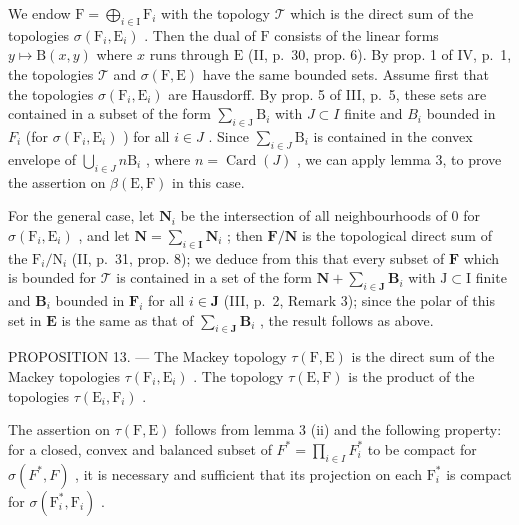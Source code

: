 We endow \(\mathrm{F} = \bigoplus_{i\in \mathrm{I}}\mathrm{F}_i\) with the topology \(\mathcal{T}\) which is the direct sum of the topologies \(\sigma (\mathrm{F}_i,\mathrm{E}_i)\) . Then the dual of \(\mathrm{F}\) consists of the linear forms \(y\mapsto \mathrm{B}(x,y)\) where \(x\) runs through \(\mathrm{E}\) (II, p.~30, prop. 6). By prop. 1 of IV, p.~1, the topologies \(\mathcal{T}\) and \(\sigma (\mathrm{F},\mathrm{E})\) have the same bounded sets. Assume first that the topologies \(\sigma (\mathrm{F}_i,\mathrm{E}_i)\) are Hausdorff. By prop. 5 of III, p.~5, these sets are contained in a subset of the form \(\sum_{i\in \mathrm{J}}\mathrm{B}_i\) with \(J\subset I\) finite and \(B_{i}\) bounded in \(F_{i}\) (for \(\sigma (\mathrm{F}_i,\mathrm{E}_i)\) ) for all \(i\in J\) . Since \(\sum_{i\in J}\mathrm{B}_{i}\) is contained in the convex envelope of \(\bigcup_{i\in J}n\mathrm{B}_{i}\) , where \(n = \operatorname {Card}(J)\) , we can apply lemma 3, to prove the assertion on \(\beta (\mathrm{E},\mathrm{F})\) in this case.

For the general case, let \(\mathbf{N}_i\) be the intersection of all neighbourhoods of 0 for \(\sigma (\mathrm{F}_i,\mathrm{E}_i)\) , and let \(\mathbf{N} = \sum_{i\in \mathbf{I}}\mathbf{N}_i\) ; then \(\mathbf{F} / \mathbf{N}\) is the topological direct sum of the \(\mathrm{F}_i / \mathrm{N}_i\) (II, p.~31, prop. 8); we deduce from this that every subset of \(\mathbf{F}\) which is bounded for \(\mathcal{T}\) is contained in a set of the form \(\mathbf{N} + \sum_{i\in \mathbf{J}}\mathbf{B}_i\) with \(\mathrm{J}\subset \mathrm{I}\) finite and \(\mathbf{B}_i\) bounded in \(\mathbf{F}_i\) for all \(i\in \mathbf{J}\) (III, p.~2, Remark 3); since the polar of this set in \(\mathbf{E}\) is the same as that of \(\sum_{i\in \mathbf{J}}\mathbf{B}_i\) , the result follows as above.

PROPOSITION 13. --- The Mackey topology \(\tau(\mathrm{F},\mathrm{E})\) is the direct sum of the Mackey topologies \(\tau(\mathrm{F}_i,\mathrm{E}_i)\) . The topology \(\tau(\mathrm{E},\mathrm{F})\) is the product of the topologies \(\tau(\mathrm{E}_i,\mathrm{F}_i)\) .

The assertion on \(\tau(\mathrm{F},\mathrm{E})\) follows from lemma 3 (ii) and the following property: for a closed, convex and balanced subset of \(F^{*} = \prod_{i\in I}F_{i}^{*}\) to be compact for \(\sigma(F^{*},F)\) , it is necessary and sufficient that its projection on each \(\mathrm{F}_i^*\) is compact for \(\sigma(\mathrm{F}_i^*, \mathrm{F}_i)\) .


